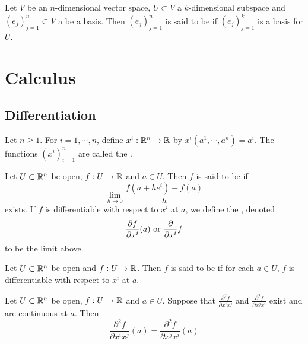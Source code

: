 \documentclass{book}
\begin{document}
	\begin{defn}  
		Let $V$ be an $n$-dimensional vector space, $U \subset V$ a $k$-dimensional subspace and $(e_j)_{j=1}^n \subset V$ a be a basis. Then $(e_j)_{j=1}^n$ is said to be  if $(e_j)_{j=1}^k$ is a basis for $U$.
	\end{defn}








	
	\newpage
	\section{Calculus}
	
	\subsection{Differentiation}
	
	\begin{defn} 
		Let $n \geq 1$. For $i = 1, \cdots, n$, define $x^i: \mathbb{R}^n \rightarrow \mathbb{R}$ by $x^i(a^1, \cdots, a^n) = a^i$. The functions $(x^i)_{i=1}^n$ are called the . 
	\end{defn}
	
	\begin{defn} 
		Let $U \subset \mathbb{R}^n$ be open, $f: U \rightarrow \mathbb{R}$ and $a \in U$. Then $f$ is said to be  if $$\lim\limits_{h \rightarrow 0} \frac{f(a + he^i) - f(a)}{h}$$ exists. If $f$ is differentiable with respect to $x^i$ at $a$, we define the , denoted $$\frac{\partial f}{\partial x^i} (a) \text{ or } \frac{\partial}{\partial x^i} f $$ to be the limit above.
		
	\end{defn}
		
	\begin{defn} 
		Let $U \subset \mathbb{R}^n$ be open and $f: U \rightarrow \mathbb{R}$. Then $f$ is said to be  if for each $a \in U$, $f$ is differentiable with respect to $x^i$ at $a$.
	\end{defn}

	\begin{ex} 
		Let $U \subset \mathbb{R}^n$ be open, $f: U \rightarrow \mathbb{R}$ and $a \in U$. Suppose that $\frac{\partial ^2 f}{\partial x^i x^j}$ and $\frac{\partial ^2 f}{\partial x^j x^i}$ exist and are continuous at $a$. Then $$\frac{\partial ^2 f}{\partial x^i x^j} (a) = \frac{\partial ^2 f}{\partial x^j x^i} (a)$$
	\end{ex}
\end{document}

